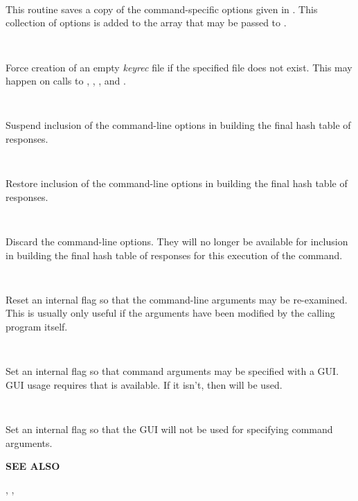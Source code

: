 \begin{description}
\item {}\verb" "

This routine saves a copy of the command-specific options given in {\it
\@csopts}.  This collection of options is added to the {\it \@csopts} array
that may be passed to .

\item {}\verb" "

Force creation of an empty {\it keyrec} file if the specified file does not
exist.  This may happen on calls to ,
, , and .

\item {}\verb" "

Suspend inclusion of the command-line options in building the final hash
table of responses.

\item {}\verb" "

Restore inclusion of the command-line options in building the final hash
table of responses.

\item {}\verb" "

Discard the command-line options.  They will no longer be available for
inclusion in building the final hash table of responses for this execution
of the command.

\item {}\verb" "

Reset an internal flag so that the command-line arguments may be
re-examined.  This is usually only useful if the arguments have been
modified by the calling program itself.

\item {}\verb" "

Set an internal flag so that command arguments may be specified with a GUI.
GUI usage requires that  is available.  If it
isn't, then  will be used.

\item {}\verb" "

Set an internal flag so that the GUI will not be used for specifying
command arguments.

\end{description}

{\bf SEE ALSO}


,
,


